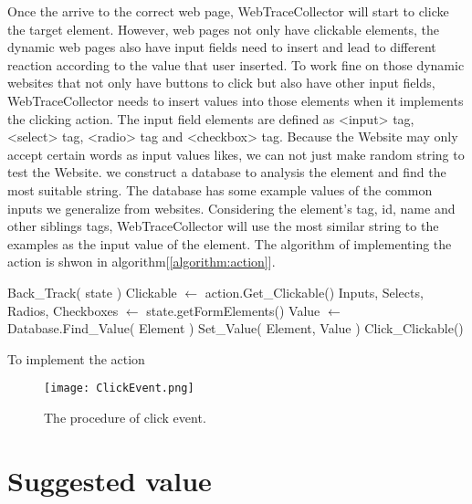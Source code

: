Once the arrive to the correct web page, WebTraceCollector will start to clicke the target element.
However, web pages not only have clickable elements,
the dynamic web pages also have input fields need to insert and 
lead to different reaction according to the value that user inserted.
To work fine on those dynamic websites that not only have buttons to click but also have other input fields,
WebTraceCollector needs to insert values into those elements when it implements the clicking action.
The input field elements are defined as <input> tag, <select> tag, <radio> tag and <checkbox> tag.
Because the Website may only accept certain words as input values likes, 
we can not just make random string to test the Website.
we construct a database to analysis the element and find the most suitable string.
The database has some example values of the common inputs we generalize from websites.
Considering the element's tag, id, name and other siblings tags,
WebTraceCollector will use the most similar string to the examples as the input value of the element.
The algorithm of implementing the action is shwon in algorithm[\ref{algorithm:action}].

\begin{algorithm}[htb]
	\begin{doublespace}		
		{
			Back\_Track( state )\;
		}
		Clickable $\gets$ action.Get\_Clickable()\;
		Inputs, Selects, Radios, Checkboxes $\gets$ state.getFormElements()\;
		{
			Value $\gets$ Database.Find\_Value( Element )\;
			Set\_Value( Element, Value )\;
		}
		Click\_Clickable()\;		
	\end{doublespace}
	\caption{To implement the action}
	\label{algorithm:action}
\end{algorithm} 


\begin{figure}[h]
	\graphicspath{{pic/}}
	\begin{center}
		\texttt{[image: ClickEvent.png]}
	\end{center}
	\caption{The  procedure of click event. }
	\label{ClickEvent}
\end{figure}


\clearpage

\section{Suggested value}

